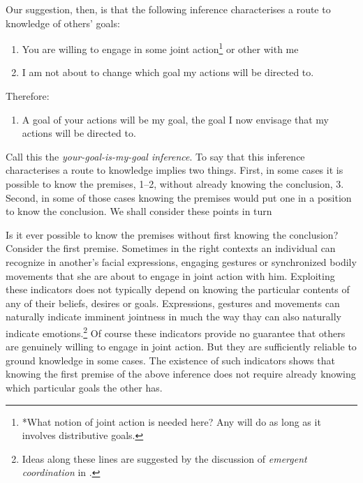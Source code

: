 \documentclass[14pt,a4paper]{extarticle}
\begin{document}
Our suggestion, then, is that the following inference characterises a route to knowledge of others’ goals:
%
\begin{enumerate}
\item You are willing to engage in some joint action\footnote{
*What notion of joint action is needed here?  Any will do as long as it involves distributive goals.
}
or other with me

\item I am not about to change which goal my actions will be directed to.

\end{enumerate}
%
Therefore:
%
\begin{enumerate}[resume]
%
\item A goal of your actions will be my goal, the goal I now envisage that my actions will be directed to.
\end{enumerate}
%
Call this the \emph{your-goal-is-my-goal inference}.  
To say that this inference characterises a route to knowledge implies two things.  
First, in some cases it is possible to know the premises, 1–2, without already knowing the conclusion, 3.  
Second, in some of those cases knowing the premises would put one in a position to know the conclusion.  
We shall consider these points in turn


Is it ever possible to know the premises without first knowing the conclusion?  
Consider the first premise.  
Sometimes 
in the right contexts
an individual can recognize in another's facial expressions, engaging gestures or synchronized bodily movements that she are about to engage in joint action with him.
Exploiting these indicators does not typically depend on knowing the particular contents of any of their beliefs, desires or goals.  
Expressions, gestures and movements can naturally indicate imminent jointness in much the way thay can also naturally indicate emotions.\footnote{
Ideas along these lines are suggested by the discussion of \emph{emergent coordination} in \citet{Knoblich:2010fk}.
}  
Of course these indicators provide no guarantee that others are genuinely willing to engage in joint action.  
But they are sufficiently reliable to ground knowledge in some cases.  
The existence of such indicators shows that knowing the first  premise of the above inference does not require already knowing which particular goals the other has.  
\end{document}
